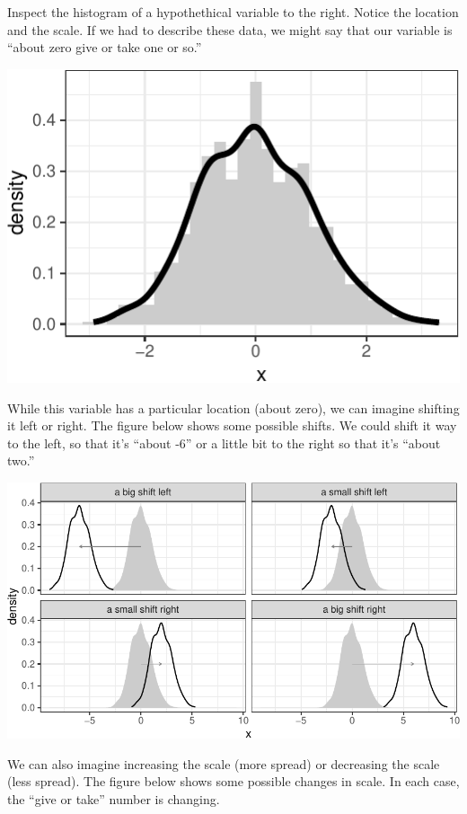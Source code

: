 \documentclass[]{book}
\begin{document}
Inspect the histogram of a hypothethical variable to the right. Notice the location and the scale. If we had to describe these data, we might say that our variable is ``about zero give or take one or so.''

\includegraphics{concepts-and-computation_files/figure-latex/unnamed-chunk-1-1.pdf}

While this variable has a particular location (about zero), we can imagine shifting it left or right. The figure below shows some possible shifts. We could shift it way to the left, so that it's ``about -6'' or a little bit to the right so that it's ``about two.''

\includegraphics{concepts-and-computation_files/figure-latex/unnamed-chunk-2-1.pdf}

We can also imagine increasing the scale (more spread) or decreasing the scale (less spread). The figure below shows some possible changes in scale. In each case, the ``give or take'' number is changing.
\end{document}
